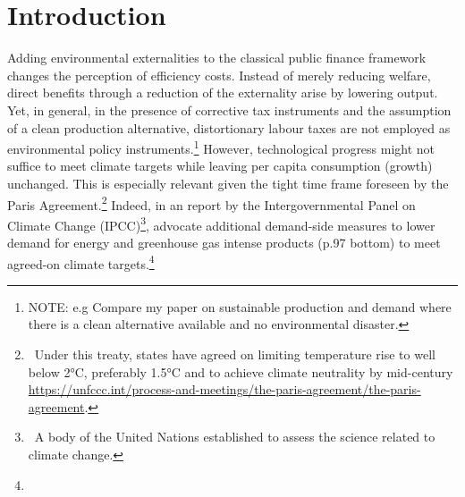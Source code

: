 
\tableofcontents
\section{Introduction}


 Adding environmental externalities to the classical public finance framework changes the perception of efficiency costs. Instead of merely reducing welfare, direct benefits through a reduction of the externality arise by lowering output. 
Yet, in general, in the presence of corrective tax instruments and the assumption of a clean production alternative, %
distortionary labour taxes are not employed as environmental policy instruments.\footnote{ NOTE: e.g Compare my paper on sustainable production and demand where there is a clean alternative available and no environmental disaster.} 
However, technological progress might not suffice to meet climate targets while leaving per capita consumption (growth) unchanged. This is especially relevant given the tight time frame foreseen by the Paris Agreement.\footnote{\ Under this treaty, states have agreed on limiting temperature rise to well below 2°C, preferably 1.5°C and to achieve climate neutrality by mid-century \url{https://unfccc.int/process-and-meetings/the-paris-agreement/the-paris-agreement}. } Indeed, in an report by the Intergovernmental Panel on Climate Change (IPCC)\footnote{\ A body of the United Nations established to assess the science related to climate change.},  \cite{Rogelj2018MitigationDevelopment.} advocate additional demand-side measures to lower demand for energy and greenhouse gas intense products (p.97 bottom) to meet agreed-on climate targets.\footnote{}


